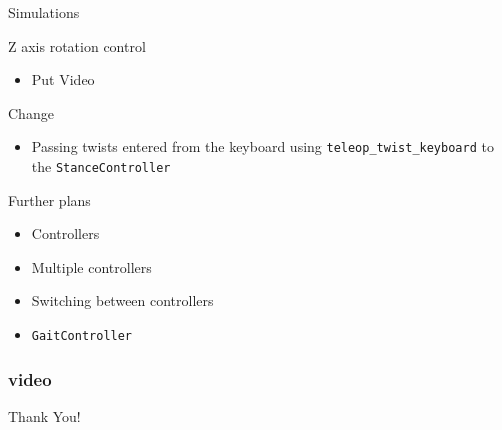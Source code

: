 \documentclass{beamer}
\begin{document}
\begin{frame}{Simulations}

\begin{block}{Z axis rotation control}
    \begin{itemize}
        \item Put Video
    \end{itemize}
\end{block}

\begin{block}{Change}
    \begin{itemize}
        \item Passing twists entered from the keyboard using \texttt{teleop\_twist\_keyboard} to the \texttt{StanceController}
    \end{itemize}
\end{block}

\end{frame}


\begin{frame}{Further plans}

\begin{itemize}
        \item Controllers
        \item Multiple controllers
        \item Switching between controllers
        \item \texttt{GaitController}
\end{itemize}

\end{frame}


\begin{frame}
    \frametitle{video}
    \centering
\end{frame}

\begin{frame}
	\LARGE{Thank You!}
\end{frame}\normalfont
\end{document}
